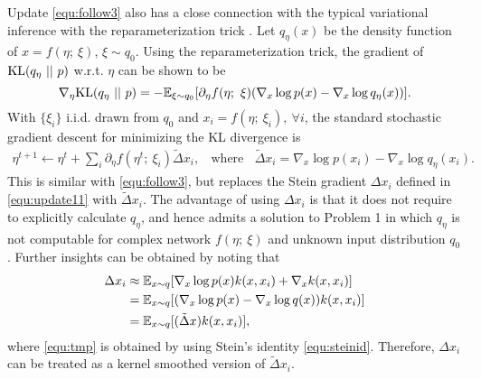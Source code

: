\documentclass{article} %
\begin{document}
Update \eqref{equ:follow3} also has a close connection with the typical variational inference with the reparameterization trick \citep{kingma2013auto}. Let $q_\eta(x)$ be the density function of $x = f(\eta;~\xi)$, $\xi\sim q_0$. Using the reparameterization trick, the gradient of $\mathrm{KL}(q_\eta~||~p)$ w.r.t. $\eta$ can be shown to be 
$$
\nabla_\eta\mathrm{KL}(q_{\eta}~||~p) = -\mathbb{E}_{\xi \sim q_0}[\partial_\eta f(\eta;~\xi)(\nabla_x \log p(x) - \nabla_x \log q_\eta(x))]. 
$$
With $\{\xi_i\}$ i.i.d. drawn from $q_0$ and $x_i = f(\eta;~\xi_i), ~\forall i$, the standard stochastic gradient descent for minimizing the KL divergence is 
\begin{align}\label{equ:rep}
\eta^{t+1} \gets \eta^t +  \sum_i \partial_\eta f(\eta^t;~\xi_i) \tilde \Delta x_i, ~~~~ \text{where} ~~~~ 
\tilde \Delta x_i = \nabla_x \log p(x_i) - \nabla_x \log q_\eta(x_i). 
\end{align}
This is similar with \eqref{equ:follow3}, but replaces the Stein gradient $\Delta x_i$ defined in \eqref{equ:update11} with 
$\tilde \Delta x_i$. The advantage of using $\Delta x_i$ is that it does not require to explicitly calculate $q_\eta$,
and hence admits a solution to Problem 1 in which $q_\eta$ is not computable for complex network $f(\eta; ~\xi)$ and unknown input distribution $q_0$. 
Further insights can be obtained by noting that 
\begin{align}
\label{equ:tmp}
\Delta x_i 
& \approx \mathbb{E}_{x\sim q}[\nabla_x \log p(x)k(x,x_i) + \nabla_xk(x,x_i)] \notag \\
& =  \mathbb{E}_{x\sim q}[(\nabla_x \log p(x) - \nabla_x \log q(x))k(x,x_i)]  \\
& = \mathbb{E}_{x\sim q} [( \tilde \Delta x) k(x, x_i)],  \notag
\end{align}
where \eqref{equ:tmp} is obtained by using Stein's identity \eqref{equ:steinid}. 
Therefore, %
$\Delta x_i$ can be treated as a kernel smoothed version of $\tilde \Delta x_i $. 
\end{document}
